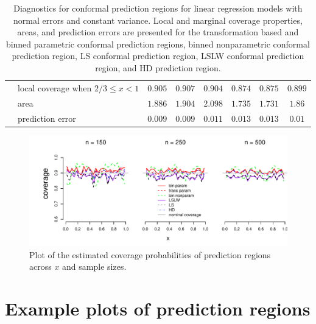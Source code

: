\documentclass[11pt]{article}\usepackage[]{graphicx}\usepackage[]{color}
\makeatletter
\def\maxwidth{ %
  \ifdim\Gin@nat@width>\linewidth
    \linewidth
  \else
    \Gin@nat@width
  \fi
}
\newenvironment{knitrout}{}{} %
\makeatother
\begin{document}
\begin{table}[h!]
\begin{center}
\begin{tabular}{llcccccc}
    & local coverage when $2/3 \leq x < 1$ &
  $0.905$ & 
  $0.907$ & 
  $0.904$ & 
  $0.874$ & 
  $0.875$ & 
  $0.899$ \\
    & area & 
  $1.886$ & 
  $1.904$ & 
  $2.098$ & 
  $1.735$ & 
  $1.731$ & 
  $1.86$ \\
    & prediction error & 
  $0.009$ & 
  $0.009$ & 
  $0.011$ & 
  $0.013$ & 
  $0.013$ & 
  $0.01$ 
\end{tabular}
\end{center}
\caption{Diagnostics for conformal prediction regions for linear regression 
  models with normal errors and constant variance.  Local and marginal 
  coverage properties, areas, and prediction errors are presented for the 
    transformation based and binned parametric conformal prediction regions,
    binned nonparametric conformal prediction region,
    LS conformal prediction region, 
    LSLW conformal prediction region, and 
    HD prediction region.} %
\label{Tab:regression-results}
\end{table}







\newpage
\begin{figure}[h!]
\begin{center}
\begin{knitrout}
\color{fgcolor}
\includegraphics[width=\maxwidth]{figure/Fig-regression-inx-500-1} 

\end{knitrout}
\end{center}
\caption{Plot of the estimated coverage probabilities of prediction regions 
  across $x$ and sample sizes.}
\label{Fig:regresion.inx}
\end{figure}




\newpage
\section{Example plots of prediction regions}
\label{sec:plotsofregions}
\end{document}
